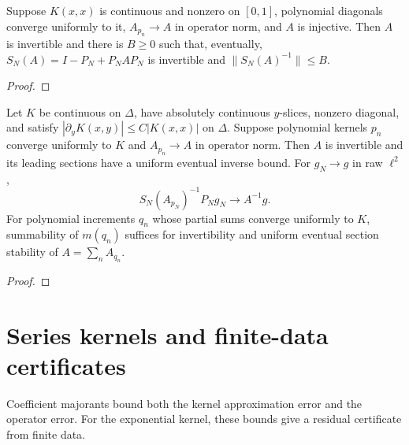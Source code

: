 \begin{supporting}
\begin{theorem}
\label{thm:volterra-limit-stability}
\leanok
Suppose $K(x,x)$ is continuous and nonzero on $[0,1]$, polynomial diagonals
converge uniformly to it, $A_{p_n}\to A$ in operator norm, and $A$ is injective.
Then $A$ is invertible and there is $B\ge0$ such that, eventually,
$S_N(A)=I-P_N+P_NAP_N$ is invertible and $\|S_N(A)^{-1}\|\le B$.
\end{theorem}
\begin{proof}
\leanok
\end{proof}
\end{supporting}


\begin{theorem}
\label{thm:continuous-volterra-solves}
\leanok
Let $K$ be continuous on $\Delta$, have absolutely continuous $y$-slices,
nonzero diagonal, and satisfy $|\partial_yK(x,y)|\le C|K(x,x)|$ on $\Delta$.
Suppose polynomial kernels $p_n$ converge uniformly to $K$ and $A_{p_n}\to A$
in operator norm. Then $A$ is invertible and its leading sections have a
uniform eventual inverse bound. For $g_N\to g$ in raw $\ell^2$,
\[
 S_N(A_{p_N})^{-1}P_Ng_N\longrightarrow A^{-1}g.
\]
For polynomial increments $q_n$ whose partial sums converge uniformly to $K$,
summability of $m(q_n)$ suffices for invertibility and uniform eventual section
stability of $A=\sum_n A_{q_n}$.

\end{theorem}
\begin{proof}
\leanok
\end{proof}



\chapter{Series kernels and finite-data certificates}\label{chap:volterra-series}
Coefficient majorants bound both the kernel approximation error and the
operator error. For the exponential kernel, these bounds give a residual
certificate from finite data.

